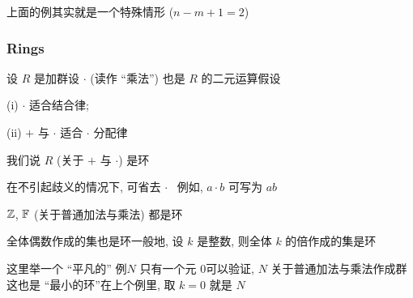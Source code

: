 \begin{remark}
    上面的例其实就是一个特殊情形 ($n - m + 1 = 2$)\period
\end{remark}

\subsubsection*{Rings}

\begin{definition}
    设 $R$ 是加群\period 设 $\cdot$ (读作 ``乘法'') 也是 $R$ 的二元运算\period 假设

    (i) $\cdot$ 适合结合律;

    (ii) $+$ 与 $\cdot$ 适合 $\cdot$ 分配律\period

    我们说 $R$ (关于 $+$ 与 $\cdot$) 是环 \period
\end{definition}

\begin{remark}
    在不引起歧义的情况下, 可省去 $\cdot$ \, \period 例如, $a \cdot b$ 可写为 $ab$\period
\end{remark}

\begin{example}
    $\mathbb{Z}$, $\mathbb{F}$ (关于普通加法与乘法) 都是环\period
\end{example}

\begin{example}
    全体偶数作成的集也是环\period 一般地, 设 $k$ 是整数, 则全体 $k$ 的倍作成的集是环\period
\end{example}

\begin{example}
    这里举一个 ``平凡的''  例\period $N$ 只有一个元 $0$\period 可以验证, $N$ 关于普通加法与乘法作成群\period 这也是 ``最小的环''\period 在上个例里, 取 $k=0$ 就是 $N$\period
\end{example}

